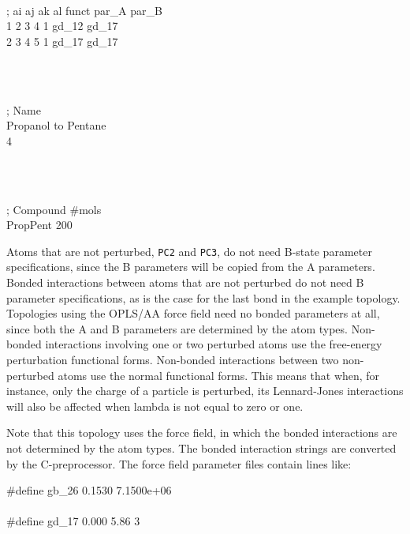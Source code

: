 \begin{tt}
[ dihedrals ]\\
;  ai    aj    ak    al funct    par\_A   par\_B\\
    1     2     3     4     1    gd\_12   gd\_17\\
    2     3     4     5     1    gd\_17   gd\_17\\
\end{tt}\\
\begin{tt}
[ system ]\\
; Name\\
Propanol to Pentane\\
4\end{tt}\\
\begin{tt}
[ molecules ]\\
; Compound        \#mols\\
PropPent            200\\
\end{tt}

Atoms that are not perturbed, {\tt PC2} and {\tt PC3}, do not need B-state parameter
specifications, since the B parameters will be copied from the A parameters.
Bonded interactions between atoms that are not perturbed do not need B
parameter specifications, as is the case for the last bond in the example topology.
Topologies using the OPLS/AA force field need no bonded parameters at all,
since both the A and B parameters are determined by the atom types.
Non-bonded interactions involving one or two perturbed atoms use the 
free-energy perturbation functional forms.
Non-bonded interactions between two non-perturbed atoms use the normal
functional forms.
This means that when, for instance, only the charge of a particle is
perturbed, its Lennard-Jones interactions will also be affected when
lambda is not equal to zero or one.

Note that this topology uses the  force field, in which the bonded
interactions are not determined by the atom types. The bonded interaction
strings are converted by the C-preprocessor. The force field parameter
files contain lines like:

\begin{tt}
\#define gb\_26       0.1530  7.1500e+06\\
\\
\#define gd\_17     0.000       5.86          3\\
\end{tt}

